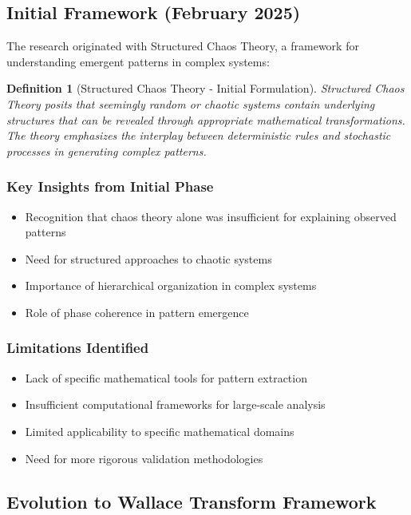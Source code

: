 \documentclass[12pt]{article}
\newtheorem{definition}{Definition}
\begin{document}
\subsection{Initial Framework (February 2025)}

The research originated with Structured Chaos Theory, a framework for understanding emergent patterns in complex systems:

\begin{definition}[Structured Chaos Theory - Initial Formulation]
Structured Chaos Theory posits that seemingly random or chaotic systems contain underlying structures that can be revealed through appropriate mathematical transformations. The theory emphasizes the interplay between deterministic rules and stochastic processes in generating complex patterns.
\end{definition}

\subsubsection{Key Insights from Initial Phase}
\begin{itemize}
    \item Recognition that chaos theory alone was insufficient for explaining observed patterns
    \item Need for structured approaches to chaotic systems
    \item Importance of hierarchical organization in complex systems
    \item Role of phase coherence in pattern emergence
\end{itemize}

\subsubsection{Limitations Identified}
\begin{itemize}
    \item Lack of specific mathematical tools for pattern extraction
    \item Insufficient computational frameworks for large-scale analysis
    \item Limited applicability to specific mathematical domains
    \item Need for more rigorous validation methodologies
\end{itemize}

\subsection{Evolution to Wallace Transform Framework}
\end{document}
